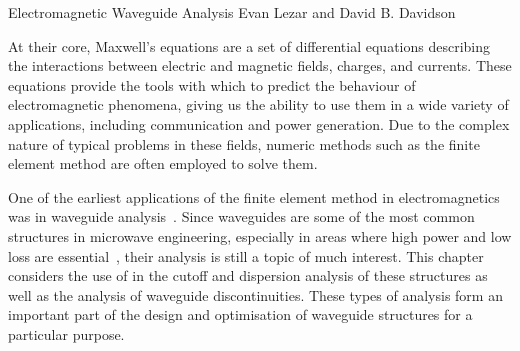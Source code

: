               {Electromagnetic Waveguide Analysis}
              {Evan Lezar and David B. Davidson}
\newcommand{\curl}[2]{\nabla_{#2} \times {#1}}
\newcommand{\field}[1]{\ensuremath{\mathbf{#1}}}
\newcommand{\Ef}[0]{\field{E}}
%
\newcommand{\ko}[2]{k_{#1}^{#2}}
\newcommand{\ur}{\mu_r}
\newcommand{\er}{\epsilon_r}
\newcommand{\unit}[1]{\hat{\field{#1}}}
\newcommand{\Domain}[1]{\Omega_{#1}}
\newcommand{\Boundary}[1]{\Gamma_{#1}}
\newcommand{\intoverdomain}[2]{\int_{#2}{#1}{d#2}}
%
\newcommand{\inv}[1]{\frac{1}{#1}}
\newcommand{\del}[2]{\nabla_{#2}{#1}}
%
\newcommand{\twobytwo}[4]{\begin{bmatrix} #1 & #2\\#3 & #4\end{bmatrix}}
\newcommand{\twobyone}[2]{\begin{Bmatrix}#1\\#2\end{Bmatrix}}   

At their core, Maxwell's equations are a
set of differential equations describing the interactions between
electric and magnetic fields, charges, and currents. These equations
provide the tools with which to predict the behaviour of
electromagnetic phenomena, giving us the
ability to use them in a wide variety of applications, including
communication and power generation. Due to the complex nature of
typical problems in these fields, numeric methods such as the finite
element method are often employed to solve them.

One of the earliest applications of the finite element method in
electromagnetics was in waveguide
analysis~\cite{Dav2005}. Since waveguides are some of the most common
structures in microwave engineering, especially in areas where high
power and low loss are essential~\cite{Poz2005}, their analysis is
still a topic of much interest. This chapter considers the use of
\fenics{} in the cutoff and dispersion analysis of these structures as
well as the analysis of waveguide discontinuities. These types of
analysis form an important part of the design and optimisation of
waveguide structures for a particular purpose.

